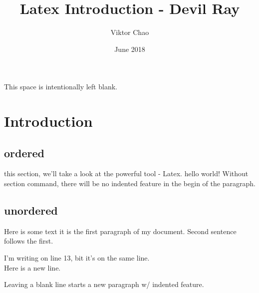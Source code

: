 \documentclass[a4paper, 12pt]{article} %
\title{Latex Introduction - Devil Ray }
\author{Viktor Chao}
\date{June 2018}
\begin{document}
\maketitle
\tableofcontents

\vspace{3cm}
This space is intentionally left blank.

\newpage

\section{Introduction}
\subsection{ordered}
this section, we'll take a look at the powerful tool - Latex.
hello world! Without section command, there will be no indented feature in the begin of the paragraph.

\subsection{unordered}
Here is some text it is the first paragraph of my document. Second sentence follows the first.

I'm writing on line 13, bit it's on the same line.\\
Here is a new line. %

Leaving a blank line starts a new paragraph w/ indented feature. \cite{maxwell1992thermodynamics}

\vspace{1cm}



    \pagebreak


    
%




%

\newpage


\end{document}
